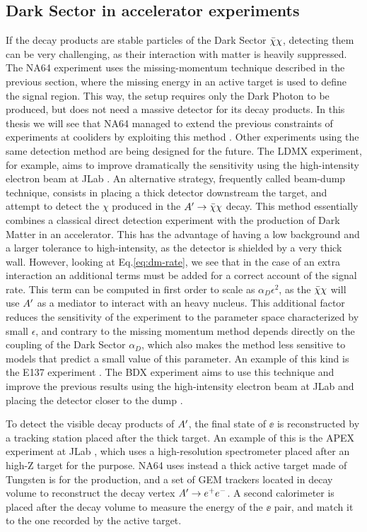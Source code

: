   \subsection{Dark Sector in accelerator experiments}

If the decay products are stable particles of the Dark Sector $\bar{\chi} \chi$, detecting them can be very challenging, as their interaction with matter is heavily suppressed. The NA64 experiment uses the missing-momentum technique described in the previous section, where the missing energy in an active target is used to define the signal region. This way, the setup requires only the Dark Photon to be produced, but does not need a massive detector for its decay products. In this thesis we will see that NA64 managed to extend the previous constraints of experiments at cooliders by exploiting this method \cite{NA64:2019imj}. Other experiments using the same detection method are being designed for the future. The LDMX experiment, for example, aims to improve dramatically the sensitivity using the high-intensity electron beam at JLab \cite{Moreno:2019tfm}. An alternative strategy, frequently called beam-dump technique, consists in placing a thick detector downstream the target, and attempt to detect the $\chi$ produced in the $A' \to \bar{\chi} \chi$ decay. This method essentially combines a classical direct detection experiment with the production of Dark Matter in an accelerator. This has the advantage of having a low background and a larger tolerance to high-intensity, as the detector is shielded by a very thick wall. However, looking at Eq.\ref{eq:dm-rate}, we see that in the case of an extra interaction an additional terms must be added for a correct account of the signal rate. This term can be computed in first order to scale as $\alpha_D \epsilon^2$, as the $\bar{\chi} \chi$ will use $A'$ as a mediator to interact with an heavy nucleus. This additional factor reduces the sensitivity of the experiment to the parameter space characterized by small $\epsilon$, and contrary to the missing momentum method depends directly on the coupling of the Dark Sector $\alpha_D$, which also makes the method less sensitive to models that predict a small value of this parameter. An example of this kind is the E137 experiment \cite{e137}. The BDX experiment aims to use this technique and improve the previous results using the high-intensity electron beam at JLab and placing the detector closer to the dump \cite{Battaglieri:2019nok}.

To detect the visible decay products of $A'$, the final state of $\ee$ is reconstructed by a tracking station placed after the thick target. An example of this is the APEX experiment at JLab \cite{apex}, which uses a high-resolution spectrometer placed after an high-Z target for the purpose. NA64 uses instead a thick active target made of Tungsten is for the production, and a set of GEM trackers located in decay volume to reconstruct the decay vertex $A' \to e^+e^-$. A second calorimeter is placed after the decay volume to measure the energy of the $\ee$ pair, and match it to the one recorded by the active target.

